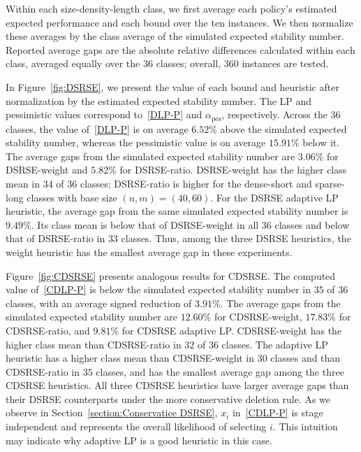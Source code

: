 \documentclass{article}
\DeclareMathOperator{\pes}{pes}
\begin{document}
{Within each size-density-length class, we first average each policy's estimated expected performance and each bound over the ten instances.
We then normalize these averages by the class average of the simulated expected stability number. 
Reported average gaps are the absolute relative differences calculated within each class, averaged equally over the $36$ classes;
overall, $360$ instances are tested.}

{
In Figure~\ref{fig:DSRSE}, we present the value of each bound and
heuristic after normalization by the estimated expected stability
number. The LP and pessimistic values correspond to~\eqref{DLP-P}
and $\alpha_{\pes}$, respectively. Across the $36$ classes, the
value of~\eqref{DLP-P} is on average $6.52\%$ above the simulated expected stability number,
whereas the pessimistic value is on average $15.91\%$ below it.
The average gaps from the simulated expected stability number are $3.06\%$ for DSRSE-weight
and $5.82\%$ for DSRSE-ratio. DSRSE-weight has the higher class mean
in $34$ of $36$ classes; DSRSE-ratio is higher for the dense-short
and sparse-long classes with base size $(n,m)=(40,60)$.
For the DSRSE adaptive LP heuristic, the average gap from the same
simulated expected stability number is $9.49\%$. Its class mean is below that of DSRSE-weight
in all $36$ classes and below that of DSRSE-ratio in $33$ classes.
Thus, among the three DSRSE heuristics, the weight heuristic has
the smallest average gap in these experiments.

Figure~\ref{fig:CDSRSE} presents analogous results for CDSRSE.
The computed value of~\eqref{CDLP-P} is below the simulated expected stability number in $35$ of $36$ classes, with an average
signed reduction of $3.91\%$. The average gaps from the
simulated expected stability number are $12.60\%$ for CDSRSE-weight, $17.83\%$ for
CDSRSE-ratio, and $9.81\%$ for CDSRSE adaptive LP. CDSRSE-weight
has the higher class mean than CDSRSE-ratio in $32$ of $36$ classes.
The adaptive LP heuristic has a higher class mean than
CDSRSE-weight in $30$ classes and than CDSRSE-ratio in $35$ classes,
and has the smallest average gap among the three CDSRSE heuristics.
All three CDSRSE heuristics have larger average gaps than their
DSRSE counterparts under the more conservative deletion rule.
As we observe in Section~\ref{section:Conservatice DSRSE}, $x_i$ in~\eqref{CDLP-P} is stage independent and represents the overall likelihood of selecting $i$. This intuition may indicate why adaptive LP is a good heuristic in this case.
}
\end{document}
